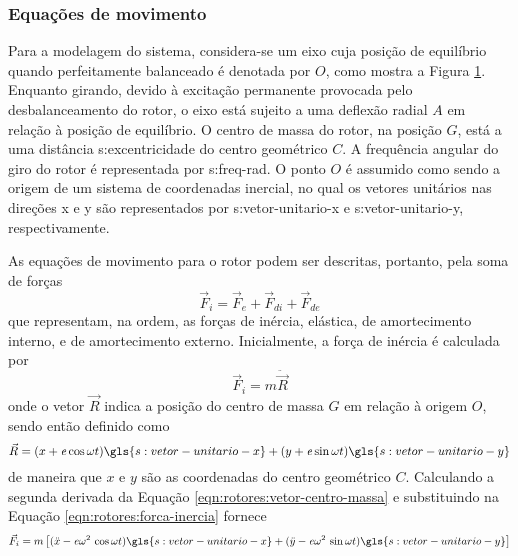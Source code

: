 \documentclass[12pt,oneside,english,brazil,lmodern,siglas,simbolos,cite=num]{ucsmonograph}
\begin{document}
	\subsubsection{Equações de movimento}
	Para a modelagem do sistema, considera-se um eixo cuja posição de equilíbrio quando perfeitamente balanceado é denotada por $\!\mathit{O}$, como mostra a Figura \ref{fig:rotor-excentrico}.
	Enquanto girando, devido à excitação permanente provocada pelo desbalanceamento do rotor, o eixo está sujeito a uma deflexão radial $\!\mathit{A}$ em relação à posição de equilíbrio.
	O centro de massa do rotor, na posição $\!\mathit{G}$, está a uma distância \gls{s:excentricidade} do centro geométrico $\!\mathit{C}$.
	A frequência angular do giro do rotor é representada por \gls{s:freq-rad}.
	O ponto $\!\mathit{O}$ é assumido como sendo a origem de um sistema de coordenadas inercial, no qual os vetores unitários nas direções x e y são representados por \gls{s:vetor-unitario-x} e \gls{s:vetor-unitario-y}, respectivamente.
	\begin{figure}[h]
		\label{fig:rotor-excentrico}
	\end{figure}
	
	As equações de movimento para o rotor podem ser descritas, portanto, pela soma de forças \cite{rao:2008}
	\begin{equation} \label{eqn:rotores:forcas}
		\vec{F}_i = \vec{F}_e + \vec{F}_{di} + \vec{F}_{de}
	\end{equation}
	que representam, na ordem, as forças de inércia, elástica, de amortecimento interno, e de amortecimento externo.
	Inicialmente, a força de inércia é calculada por \cite{rao:2008}
	\begin{equation} \label{eqn:rotores:forca-inercia}
		\vec{F}_i = m\ddot{\vec{R}}
	\end{equation}
	onde o vetor $ \vec{R} $ indica a posição do centro de massa $ \mathit{G} $ em relação à origem $ \mathit{O} $, sendo então definido como \cite{rao:2008}
	\begin{equation} \label{eqn:rotores:vetor-centro-massa}
		\vec{R} = (x + \mathit{e}\cos\omega t)\gls{s:vetor-unitario-x} + (y + \mathit{e}\sin\omega t)\gls{s:vetor-unitario-y}
	\end{equation}
	de maneira que $ x $ e $ y $ são as coordenadas do centro geométrico $ \mathit{C} $.
	Calculando a segunda derivada da Equação \ref{eqn:rotores:vetor-centro-massa} e substituindo na Equação \ref{eqn:rotores:forca-inercia} fornece
	\begin{equation} \label{eqn:rotres:forca-inercia}
		\vec{F}_i = m\left[ (\ddot{x} - \mathit{e}\omega^2\,\cos\omega t)\gls{s:vetor-unitario-x} +
		(\ddot{y} - \mathit{e}\omega^2\,\sin\omega t)\gls{s:vetor-unitario-y} \right]
	\end{equation}
	
\end{document}
